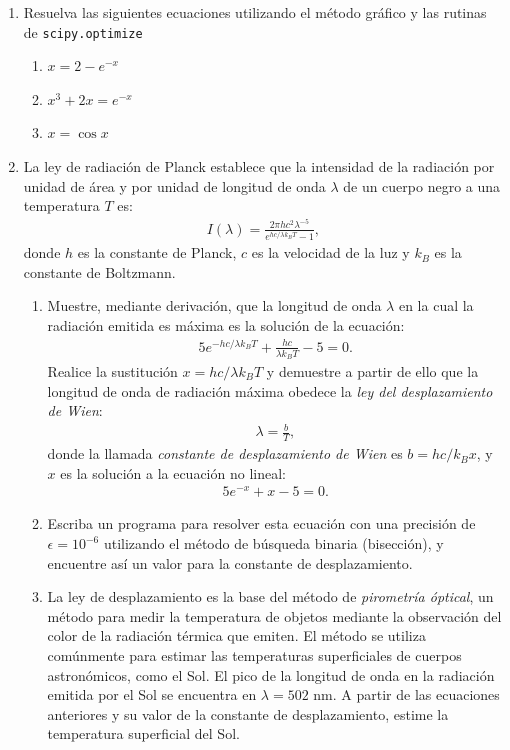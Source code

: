 \documentclass[12pt]{article}
\begin{document}
\begin{problemas}[]
\begin{enumerate}[leftmargin=*]

\item Resuelva las siguientes ecuaciones utilizando el método gráfico y las rutinas de 
\lstinline|scipy.optimize|
\begin{enumerate}
    \item $x = 2 -e^{-x}$ 
    \item $x^3 + 2x = e^{-x}$
    \item $x = \cos x$
\end{enumerate}

\item La ley de radiación de Planck establece que la intensidad de la radiación por unidad de área y por unidad de longitud de onda $\lambda$ de un cuerpo negro a una temperatura $T$ es:
\begin{align*}
I(\lambda) = \frac{2\pi h c^2 \lambda^{-5}}{e^{hc/\lambda k_B T} - 1},
\end{align*}
donde $h$ es la constante de Planck, $c$ es la velocidad de la luz y $k_B$ es la constante de Boltzmann.

\begin{enumerate}
    \item[a)] Muestre, mediante derivación, que la longitud de onda $\lambda$ en la cual la radiación emitida es máxima es la solución de la ecuación:
    \begin{align*}
    5e^{-hc/\lambda k_B T} + \frac{hc}{\lambda k_B T} - 5 = 0.
    \end{align*}
    Realice la sustitución $x = hc/\lambda k_B T$ y demuestre a partir de ello que la longitud de onda de radiación máxima obedece la \textit{ley del desplazamiento de Wien}:
    \begin{align*}
    \lambda = \frac{b}{T},
    \end{align*}
    donde la llamada \textit{constante de desplazamiento de Wien} es $b = hc/k_B x$, y $x$ es la solución a la ecuación no lineal:
    \begin{align*}
    5e^{-x} + x - 5 = 0.
    \end{align*}

    \item[b)] Escriba un programa para resolver esta ecuación con una precisión de $\epsilon = 10^{-6}$ utilizando el método de búsqueda binaria (bisección), y encuentre así un valor para la constante de desplazamiento.

    \item[c)] La ley de desplazamiento es la base del método de \textit{pirometría óptical}, un método para medir la temperatura de objetos mediante la observación del color de la radiación térmica que emiten. El método se utiliza comúnmente para estimar las temperaturas superficiales de cuerpos astronómicos, como el Sol. El pico de la longitud de onda en la radiación emitida por el Sol se encuentra en $\lambda = 502\text{ nm}$. A partir de las ecuaciones anteriores y su valor de la constante de desplazamiento, estime la temperatura superficial del Sol.
\end{enumerate}


\end{enumerate}
\end{problemas}
\end{document}
